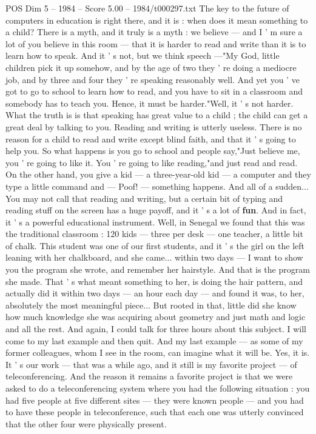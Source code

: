\begin{textsample}{POS Dim 5 – 1984 – Score 5.00 – 1984/t000297.txt}
The key to the future of computers in education is right there, and it is : when does it mean something to a child?
There is a myth, and it truly is a myth : we believe — and I ' m sure a lot of you believe in this room — that it is harder to read and write than it is to learn how to speak.
And it ' s not, but we think speech —"My God, little children pick it up somehow, and by the age of two they ' re doing a mediocre job, and by three and four they ' re speaking reasonably well.
And yet you ' ve got to go to school to learn how to read, and you have to sit in a classroom and somebody has to teach you.
Hence, it must be harder."Well, it ' s not harder.
What the truth is is that speaking has great value to a child ; the child can get a great deal by talking to you.
Reading and writing is utterly useless.
There is no reason for a child to read and write except blind faith, and that it ' s going to help you.
So what happens is you go to school and people say,"Just believe me, you ' re going to like it.
You ' re going to like reading,"and just read and read.
On the other hand, you give a kid — a three-year-old kid — a computer and they type a little command and — Poof! — something happens.
And all of a sudden...
You may not call that reading and writing, but a certain bit of typing and reading stuff on the screen has a huge payoff, and it ' s a lot of \textbf{fun}.
And in fact, it ' s a powerful educational instrument.
Well, in Senegal we found that this was the traditional classroom : 120 kids — three per desk — one teacher, a little bit of chalk.
This student was one of our first students, and it ' s the girl on the left leaning with her chalkboard, and she came... within two days — I want to show you the program she wrote, and remember her hairstyle.
And that is the program she made.
That ' s what meant something to her, is doing the hair pattern, and actually did it within two days — an hour each day — and found it was, to her, absolutely the most meaningful piece...
But rooted in that, little did she know how much knowledge she was acquiring about geometry and just math and logic and all the rest.
And again, I could talk for three hours about this subject.
I will come to my last example and then quit.
And my last example — as some of my former colleagues, whom I see in the room, can imagine what it will be.
Yes, it is.
It ' s our work — that was a while ago, and it still is my favorite project — of teleconferencing.
And the reason it remains a favorite project is that we were asked to do a teleconferencing system where you had the following situation : you had five people at five different sites — they were known people — and you had to have these people in teleconference, such that each one was utterly convinced that the other four were physically present.

\end{textsample}
